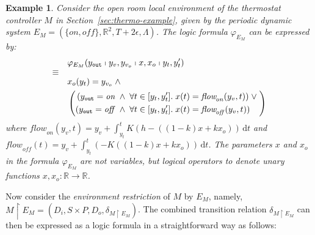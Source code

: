 \documentclass{sig-alternate}
\newtheorem{example}{Example}
\begin{document}
\begin{example}
\label{ex:openroom-formula}
Consider the open room local environment of 
the thermostat controller $M$
in Section~\ref{sec:thermo-example}, given by
the periodic dynamic system
$E_M = (\{\mathit{on},\mathit{off}\}, \mathbb{R}^2, T + 2\epsilon, \Lambda)$.
The logic formula $\varphi_{E_M}$ can be expressed by:
\begin{alignat*}{2}
&
\varphi_{E_M}(y_{\texttt{out}}\shortmid y_v, y_{v_o}\shortmid x, x_o\shortmid  y_t,y_t')
\\
\ArrowBetweenLines[\equiv]
& 
x_o(y_t) = y_{v_o} \;\wedge\; 
\\
&
\left(
\begin{aligned}
(y_{\texttt{out}} = \mathit{on}
&\;\wedge\; 
\forall t \in [y_t,y_t'].\; x(t) = \mathit{flow}_{\!\mathit{on}}(y_v, t)) \;\vee\;
\\
(y_{\texttt{out}} = \mathit{off}
&\;\wedge\; 
\forall t \in [y_t,y_t'].\; x(t) = \mathit{flow}_{\!\mathit{off}}(y_v, t))
\end{aligned}
\right)
\end{alignat*}
where
$\mathit{flow}_{\!\mathit{on}}(y_v, t) = y_v + \int_{y_t}^{t} K (h - ((1-k) x + k  x_o)) \,\mathrm{d} t$
and
$\mathit{flow}_{\!\mathit{off}}(t) = y_v + \int_{y_t}^{t} (- K ((1-k) x + k  x_o)) \,\mathrm{d} t$.
The parameters $x$ and $x_o$ in the formula $\varphi_{E_M}$
are \emph{not} variables,
but \emph{logical operators} to denote unary functions 
$x, x_o: \mathbb{R} \to \mathbb{R}$.
\end{example}



Now consider the \emph{environment restriction} of $M$ by $E_M$,
namely,
$M \restriction E_M = (D_i, S \times P, D_o, \delta_{M \restriction E_M})$.
The combined transition relation $\delta_{M \restriction E_M}$
can then be expressed as a logic formula
in a straightforward way as follows:
\end{document}

